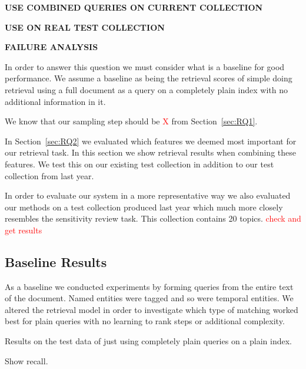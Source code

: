 \documentclass{mpaper}
\newcommand{\remove}[1]{\textcolor{red}{#1}}
\begin{document}
\textbf{USE COMBINED QUERIES ON CURRENT COLLECTION}

\textbf{USE ON REAL TEST COLLECTION}

\textbf{FAILURE ANALYSIS}


In order to answer this question we must consider what is a baseline for good performance. We assume a baseline as being the retrieval scores of simple doing retrieval using a full document as a query on a completely plain index with no additional information in it.

We know that our sampling step should be \remove{X} from Section~\ref{sec:RQ1}.

In Section~\ref{sec:RQ2} we evaluated which features we deemed most important for our retrieval task. In this section we show retrieval results when combining these features.
We test this on our existing test collection in addition to our test collection from last year.


In order to evaluate our system in a more representative way we also evaluated our methods on a test collection produced last year which much more closely resembles the sensitivity review task.
This collection contains 20 topics. \remove{check and get results}

\subsection{Baseline Results}
As a baseline we conducted experiments by forming queries from the entire text of the document.
Named entities were tagged and so were temporal entities.
We altered the retrieval model in order to investigate which type of matching worked best for plain queries with no learning to rank steps or additional complexity.

Results on the test data of just using completely plain queries on a plain index.

Show recall.
\begin{center}
\begin{table}[h]
\centering
{}
\caption{Index with no temporal resolution or named entity recognition, using full document text as queries.}
\label{plain_index_plain_results}
\end{table}
\end{center}
\end{document}
